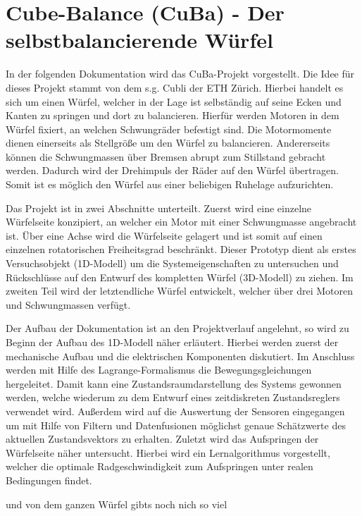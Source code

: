 \section{Cube-Balance (CuBa) - Der selbstbalancierende Würfel}
In der folgenden Dokumentation wird das CuBa-Projekt vorgestellt. Die Idee für dieses Projekt stammt von dem s.g. Cubli der ETH Zürich. Hierbei handelt es sich um einen Würfel, welcher in der Lage ist selbständig auf seine Ecken und Kanten zu springen und dort zu balancieren. Hierfür werden Motoren in dem Würfel fixiert, an welchen Schwungräder befestigt sind. Die Motormomente dienen einerseits als Stellgröße um den Würfel zu balancieren. Andererseits können die Schwungmassen über Bremsen abrupt zum Stillstand gebracht werden. Dadurch wird der Drehimpuls der Räder auf den Würfel übertragen. Somit ist es möglich den Würfel aus einer beliebigen Ruhelage aufzurichten.
\newline

Das Projekt ist in zwei Abschnitte unterteilt. Zuerst wird eine einzelne Würfelseite konzipiert, an welcher ein Motor mit einer Schwungmasse angebracht ist. Über eine Achse wird die Würfelseite gelagert und ist somit auf einen einzelnen rotatorischen Freiheitsgrad beschränkt. Dieser Prototyp dient als erstes Versuchsobjekt (1D-Modell) um die Systemeigenschaften zu untersuchen und Rückschlüsse auf den Entwurf des kompletten Würfel (3D-Modell) zu ziehen. Im zweiten Teil wird der letztendliche Würfel entwickelt, welcher über drei Motoren und Schwungmassen verfügt.
\newline

Der Aufbau der Dokumentation ist an den Projektverlauf angelehnt, so wird zu Beginn der Aufbau des 1D-Modell näher erläutert. Hierbei werden zuerst der mechanische Aufbau und die elektrischen Komponenten diskutiert. Im Anschluss werden mit Hilfe des Lagrange-Formalismus die Bewegungsgleichungen hergeleitet. Damit kann eine Zustandsraumdarstellung des Systems gewonnen werden, welche wiederum zu dem Entwurf eines zeitdiskreten Zustandsreglers verwendet wird. Außerdem wird auf die Auswertung der Sensoren eingegangen um mit Hilfe von Filtern und Datenfusionen möglichst genaue Schätzwerte des aktuellen Zustandsvektors zu erhalten. Zuletzt wird das Aufspringen der Würfelseite näher untersucht. Hierbei wird ein Lernalgorithmus vorgestellt, welcher die optimale Radgeschwindigkeit zum Aufspringen unter realen Bedingungen findet.
\newline

und von dem ganzen Würfel gibts noch nich so viel